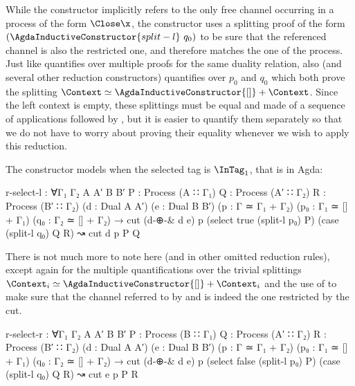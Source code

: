 \begin{AgdaAlign}
While the  constructor implicitly refers to the
only free channel occurring in a process of the form $\Close\x$, the
 constructor uses a splitting proof of the form
$(\AgdaInductiveConstructor{split-l}~q_0)$ to be sure that the referenced
channel is also the restricted one, and therefore matches the one of the
 process.
%
Just like  quantifies over multiple proofs for
the same duality relation, also  (and several
other reduction constructors) quantifies over $p_0$ and $q_0$ which both prove
the splitting $\Context \simeq \AgdaInductiveConstructor{[]} + \Context$. Since
the left context is empty, these splittings must be equal and made of a sequence
of  applications followed by
, but it is easier to quantify them separately
so that we do not have to worry about proving their equality whenever we wish to
apply this reduction.

The constructor  models \RSelect when the
selected tag is $\InTag_1$, that is  in Agda:

\begin{code}
  r-select-l  : ∀{Γ₁ Γ₂ A A′ B B′}
                {P : Process (A ∷ Γ₁)} {Q : Process (A′ ∷ Γ₂)} {R : Process (B′ ∷ Γ₂)}
                (d : Dual A A′) (e : Dual B B′)
                (p : Γ ≃ Γ₁ + Γ₂) (p₀ : Γ₁ ≃ [] + Γ₁) (q₀ : Γ₂ ≃ [] + Γ₂) →
                cut (d-⊕-& d e) p
                    (select true (split-l p₀) P)
                    (case (split-l q₀) Q R) ↝ cut d p P Q
\end{code}

There is not much more to note here (and in other omitted reduction rules),
except again for the multiple quantifications over the trivial splittings
$\Context_i \simeq \AgdaInductiveConstructor{[]} + \Context_i$ and the use of
 to make sure that the channel referred to by
 and  is indeed
the one restricted by the cut.

\begin{code}[hide]
  r-select-r  :
    ∀{Γ₁ Γ₂ A A′ B B′}
    {P : Process (B ∷ Γ₁)} {Q : Process (A′ ∷ Γ₂)} {R : Process (B′ ∷ Γ₂)}
    (d : Dual A A′) (e : Dual B B′) (p : Γ ≃ Γ₁ + Γ₂) (p₀ : Γ₁ ≃ [] + Γ₁) (q₀ : Γ₂ ≃ [] + Γ₂) →
    cut (d-⊕-& d e) p
        (select false (split-l p₀) P)
        (case (split-l q₀) Q R) ↝ cut e p P R


\end{code}
\end{AgdaAlign}
